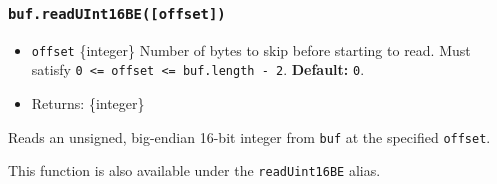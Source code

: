 \subsubsection{\texorpdfstring{\texttt{buf.readUInt16BE({[}offset{]})}}{buf.readUInt16BE({[}offset{]})}}\label{buf.readuint16beoffset}

\begin{itemize}
\tightlist
\item
  \texttt{offset} \{integer\} Number of bytes to skip before starting to
  read. Must satisfy
  \texttt{0\ \textless{}=\ offset\ \textless{}=\ buf.length\ -\ 2}.
  \textbf{Default:} \texttt{0}.
\item
  Returns: \{integer\}
\end{itemize}

Reads an unsigned, big-endian 16-bit integer from \texttt{buf} at the
specified \texttt{offset}.

This function is also available under the \texttt{readUint16BE} alias.

\begin{Shaded}
\begin{Highlighting}[]
\NormalTok{ \{ }\NormalTok{ \} } \OperatorTok{;}

\OperatorTok{=} \NormalTok{([}\OperatorTok{,} \OperatorTok{,} \NormalTok{])}\OperatorTok{;}

\NormalTok{(}\NormalTok{)}\NormalTok{(}\NormalTok{))}\OperatorTok{;}
\NormalTok{(}\NormalTok{)}\NormalTok{(}\NormalTok{))}\OperatorTok{;}
\end{Highlighting}
\end{Shaded}

